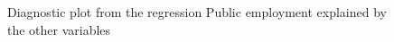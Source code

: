 \message{ !name(main.tex)}\documentclass[a4paper, 10pt]{article}
\newcommand{\insertplot}[2]{
  \begin{figure}[!ht]
    \centering
    
    \caption{#2}
  \end{figure}
}
\begin{document}
  \insertplot{model_diagnostic.tex}{Diagnostic plot from the regression
    Public employment explained by the other variables}

\end{document}
